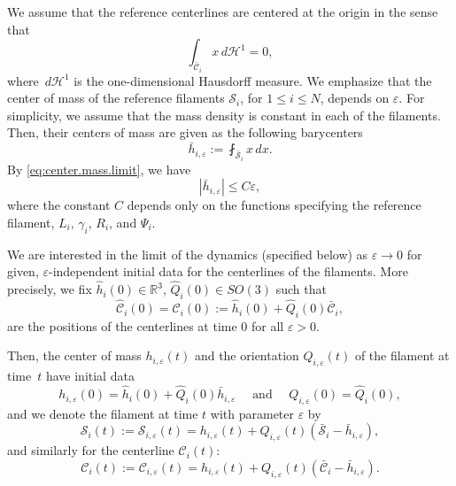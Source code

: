 \documentclass[JEP,XML,SOM,Unicode, NoEqCountersInSection,NoFloatCountersInSection,published]{cedram}
\newcommand{\R}{\mathbb{R}}
\let\eps\varepsilon
\newcommand{\cS}{\mathcal{S}}
\newcommand{\dd}{\,d}
\theoremstyle{definition}
\theoremstyle{remark}
\begin{document}
We assume that the reference centerlines are centered at the origin in the sense that\vspace*{-3pt}
\begin{equation} \label{eq:center.mass.limit}
\int_{\bar {\mathcal C}_i} x \dd \mathcal H^1 = 0,
\end{equation}
where $\dd \mathcal{H}^1$ is the one-dimensional Hausdorff measure.
We emphasize that the center of mass of the reference filaments $\mathcal S_i$, for $ 1\leq i \leq N$, depends on $\eps$. For simplicity, we assume that the mass density is constant in each of the filaments. Then, their centers of mass are given as the following barycenters
\begin{equation}
\bar h_{i,\eps} := \fint_{\bar {\cS}_i} x \dd x.
\end{equation}
By \eqref{eq:center.mass.limit}, we have\vspace*{-3pt}
\begin{equation} \label{eq:center.mass.small}
|\bar h_{i,\eps}| \leq C \eps,
\end{equation}
where the constant $C$ depends only on the functions specifying the reference filament, \ie $L_i$, $\gamma_i$, $R_i$, and $\Psi_i$.

We are interested in the limit of the dynamics (specified below) as $\eps \to 0$ for given, $\eps$-independent initial data for the centerlines of the filaments. More precisely,
we fix $\hat h_i(0) \in \R^3$, $\hat Q_i(0) \in SO(3)$ such that
\begin{equation}
\label{dimathC}
\hat{\mathcal C}_i (0) = \mathcal C_i (0) := \hat h_i(0) + \hat Q_i(0) \bar {\mathcal C}_i,
\end{equation}
are the positions of the centerlines at time $0$ for all $\eps >0$.

Then, the center of mass $h_{i,\eps}(t)$ and the orientation $Q_{i,\eps}(t)$ of the filament at time~$t$ have initial data\vspace*{-3pt}
\begin{equation} \label{eq:initial.positions}
h_{i,\eps}(0) = \hat h_i(0) + {\hat Q_{i}(0)} \bar h_{i,\eps} \quad \text{ and } \quad Q_{i,\eps}(0) = \hat Q_i(0),
\end{equation}
and we denote the filament at time $t$ with parameter $\eps$ by\vspace*{-3pt}
\begin{equation} \label{def:Stourne}
\mathcal S_i(t) := \mathcal S_{i,\eps}(t) = h_{i,\eps}(t) + {Q_{i,\eps}}(t) (\bar {\mathcal S}_i - \bar h_{i,\eps}),
\end{equation}
and similarly for the centerline $\mathcal C_i(t)$:\vspace*{-3pt}
\begin{equation*}
\mathcal C_i(t) := \mathcal C_{i,\eps}(t) = h_{i,\eps}(t) + {Q_{i,\eps}}(t) (\bar {\mathcal C}_i - \bar h_{i,\eps}).
\end{equation*}
\end{document}
